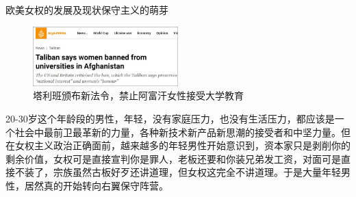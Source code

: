 \documentclass{beamer}
\begin{document}
	\begin{frame}{欧美女权的发展及现状}{保守主义的萌芽}
		\begin{figure}
			\centering
			\includegraphics[width=0.5\textwidth]{img/图片8.jpg}
			\caption{塔利班颁布新法令，禁止阿富汗女性接受大学教育}
		\end{figure}

		20-30岁这个年龄段的男性，年轻，没有家庭压力，也没有生活压力，都应该是一个社会中最前卫最革新的力量，各种新技术新产品新思潮的接受者和中坚力量。但在女权主义政治正确面前，越来越多的年轻男性开始意识到，资本家只是剥削你的剩余价值，女权可是直接宣判你是罪人，老板还要和你装兄弟发工资，对面可是直接不装了，宗族虽然古板好歹还讲道理，但女权这完全不讲道理。于是大量年轻男性，居然真的开始转向右翼保守阵营。

	\end{frame}
\end{document}
